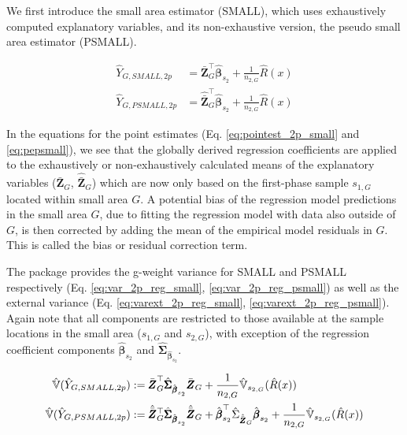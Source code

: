 
We first introduce the small area estimator (SMALL), which uses exhaustively computed explanatory variables, and its non-exhaustive version, the pseudo small area estimator (PSMALL). 

\begin{subequations}\label{eq:pest_2p_small_psmall}
\begin{align}
  \hat{Y}_{G,SMALL,2p} & =\bar{\pmb{Z}}_G^{\top}\hat{\pmb{\beta}}_{s_2} + \frac{1}{n_{2,G}}\hat{R}(x)  \label{eq:pointest_2p_small} \\
  \hat{Y}_{G,PSMALL,2p} & =\hat{\bar{\pmb{Z}}}_G^{\top}\hat{\pmb{\beta}}_{s_2} + \frac{1}{n_{2,G}}\hat{R}(x) \label{eq:pepsmall}
\end{align}
\end{subequations}

In the equations for the point estimates (Eq. \ref{eq:pointest_2p_small} and \ref{eq:pepsmall}), we see that the globally derived regression coefficients are applied to the exhaustively or non-exhaustively calculated means of the explanatory variables ($\bar{\pmb{Z}}_G$, $\hat{\bar{\pmb{Z}}}_G$) which are now only based on the first-phase sample $s_{1,G}$ located within small area $G$. A potential bias of the regression model predictions in the small area $G$, due to fitting the regression model with data also outside of $G$, is then corrected by adding the mean of the empirical model residuals in $G$. This is called the bias or residual correction term.

The package provides the g-weight variance for SMALL and PSMALL respectively (Eq. \ref{eq:var_2p_reg_small}, \ref{eq:var_2p_reg_psmall}) as well as the  external variance (Eq. \ref{eq:varext_2p_reg_small}, \ref{eq:varext_2p_reg_psmall}). Again note that all components are restricted to those available at the sample locations in the small area ($s_{1,G}$ and $s_{2,G}$), with exception of the regression coefficient components $\hat{\pmb{\beta}}_{s_2}$ and $\hat{\pmb{\Sigma}}_{\hat{\pmb{\beta}}_{s_2}}$.


\begin{subequations}\label{eq:var_2p_small_psmall}
\begin{align}
  \hat{\mathbb{V}}(\hat{Y}_{G,SMALL,2p}) & := \bar{\pmb{Z}}_G^{\top}\hat{\pmb{\Sigma}}_{\hat{\pmb{\beta}}_{s_2}}\bar{\pmb{Z}}_G
    + \frac{1}{n_{2,G}}\hat{\mathbb{V}}_{s_{2,G}}(\hat{R}(x))  \label{eq:var_2p_reg_small} \\
  \hat{\mathbb{V}}(\hat{Y}_{G,PSMALL,2p}) & := \hat{\bar{\pmb{Z}}}_G^{\top}\hat{\pmb{\Sigma}}_{\hat{\pmb{\beta}}_{s_2}}\hat{\bar{\pmb{Z}}}_G
  + \hat{\pmb{\beta}}_{s_2}^{\top}\hat{\Sigma}_{\hat{\bar{\pmb{Z}}}_G}\hat{\pmb{\beta}}_{s_2}
  + \frac{1}{n_{2,G}}\hat{\mathbb{V}}_{s_{2,G}}(\hat{R}(x))  \label{eq:var_2p_reg_psmall}
\end{align}
\end{subequations}

